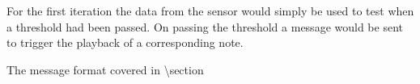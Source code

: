 For the first iteration the data from the sensor would simply be used to
test when a threshold had been passed. On passing the threshold a
message would be sent to trigger the playback of a corresponding note.

The message format covered in \textbackslash section









